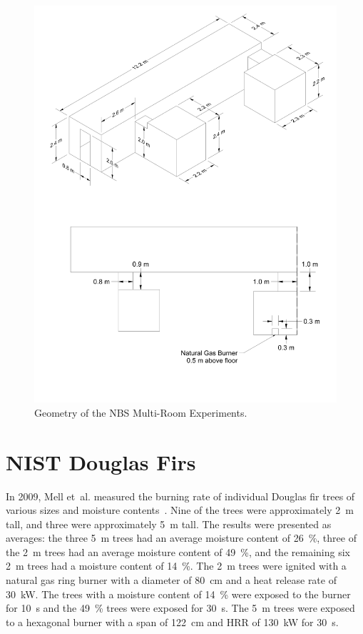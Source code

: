 \begin{figure}[p]
\includegraphics[width=\textwidth]{FIGURES/NBS/NBS}
\caption[Geometry of the NBS Multi-Room Experiments]{Geometry of the NBS Multi-Room Experiments.}
\label{NBS_Drawing}
\end{figure}


\section{NIST Douglas Firs}

In 2009, Mell et~al. measured the burning rate of individual Douglas fir trees of various sizes and moisture contents~\cite{Mell:2009}. Nine of the trees were approximately 2~m tall, and three were approximately 5~m tall. The results were presented as averages: the three 5~m trees had an average moisture content of 26~\%, three of the 2~m trees had an average moisture content of 49~\%, and the remaining six 2~m trees had a moisture content of 14~\%. The 2~m trees were ignited with a natural gas ring burner with a diameter of 80~cm and a heat release rate of 30~kW. The trees with a moisture content of 14~\% were exposed to the burner for 10~s and the 49~\% trees were exposed for 30~s. The 5~m trees were exposed to a hexagonal burner with a span of 122~cm and HRR of 130~kW for 30~s.


